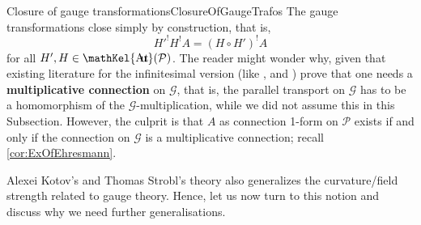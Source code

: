 \documentclass[reqno,a4paper,oneside]{amsart}
\theoremstyle{plain}
\theoremstyle{remark}
\theoremstyle{definition}
\DeclareMathOperator{\sAut}{\mathKel{A\mkern-5.5mu u\mkern-4mu t\mkern-1.5mu}}
\begin{document}
\begin{remarks}{Closure of gauge transformations}{ClosureOfGaugeTrafos}
The gauge transformations close simply by construction, that is,
\begin{equation*}
H'^!H^!A
=
(H \circ H')^!A
\end{equation*}
for all $H', H \in \sAut(\mathcal{P})$. The reader might wonder why, given that existing literature for the infinitesimal version (like \cite[Thm.\ 4.3.37 and Thm.\ 4.3.43]{MyThesis}, \cite[Prop.\ 8, Thm.\ 1]{EichtrafoKruemmungUrspruenglich} and \cite[Eq.\ 9, 10 and 11]{mayerlieAuchEichtrafoStuff}) prove that one needs a \textbf{multiplicative connection} on $\mathcal{G}$, that is, the parallel transport on $\mathcal{G}$ has to be a homomorphism of the $\mathcal{G}$-multiplication, while we did not assume this in this Subsection. However, the culprit is that $A$ as connection 1-form on $\mathcal{P}$ exists if and only if the connection on $\mathcal{G}$ is a multiplicative connection; recall \ref{cor:ExOfEhresmann}.
\end{remarks}

Alexei Kotov's and Thomas Strobl's theory also generalizes the curvature/field strength related to gauge theory. Hence, let us now turn to this notion and discuss why we need further generalisations.
\end{document}
